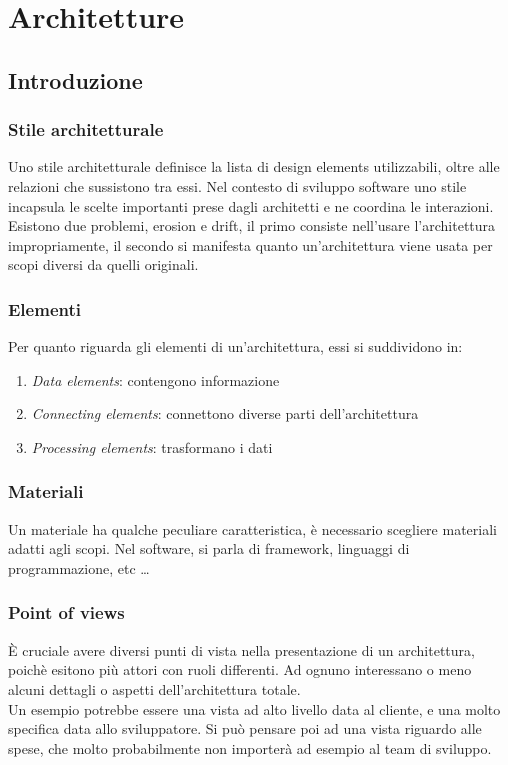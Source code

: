 \section{Architetture}
\subsection{Introduzione}

\subsubsection{Stile architetturale}
Uno stile architetturale definisce la lista di design elements utilizzabili, 
oltre alle relazioni che sussistono tra essi. Nel contesto di sviluppo software 
uno stile incapsula le scelte importanti prese dagli architetti e ne coordina le 
interazioni.
Esistono due problemi, erosion e drift, il primo consiste nell'usare l'architettura 
impropriamente, il secondo si manifesta quanto un'architettura viene usata per scopi 
diversi da quelli originali.

\subsubsection{Elementi}
Per quanto riguarda gli elementi di un'architettura, essi si suddividono in:
\begin{enumerate}
    \item \emph{Data elements}: contengono informazione
    \item \emph{Connecting elements}: connettono diverse parti dell'architettura
    \item \emph{Processing elements}: trasformano i dati
\end{enumerate}

\subsubsection{Materiali}
Un materiale ha qualche peculiare caratteristica, è necessario scegliere materiali
adatti agli scopi. Nel software, si parla di framework, linguaggi di programmazione, etc \dots

\subsubsection{Point of views}
È cruciale avere diversi punti di vista nella presentazione di un architettura, poichè 
esitono più attori con ruoli differenti.
Ad ognuno interessano o meno alcuni dettagli o aspetti dell'architettura totale.\\
Un esempio potrebbe essere una vista ad alto livello data al cliente, e una molto specifica 
data allo sviluppatore.
Si può pensare poi ad una vista riguardo alle spese, che molto probabilmente non importerà 
ad esempio al team di sviluppo. 

